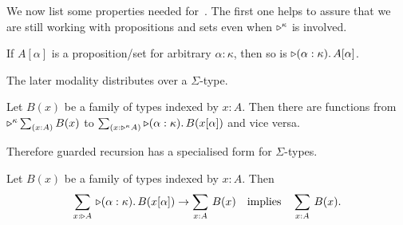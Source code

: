 \documentclass[draft,a4paper,UKenglish,numberwithinsect,cleveref,thm-restate]{lipics-v2021}
\numberwithin{equation}{section}
\theoremstyle{definition}
\theoremstyle{plain}
\begin{document}
We now list some properties needed for~.
The first one helps to assure that we are still working with propositions and sets even when $\mathord{\triangleright}^\kappa$ is involved.%
\begin{lemma}
  If $A[\alpha]$ is a proposition/set for arbitrary $\alpha : \kappa$, then so is $\mathord{\triangleright}(\alpha: \kappa).\, A [\alpha]$.
\end{lemma}
The later modality distributes over a $\Sigma$-type.
\begin{lemma}\label{lem:later-sum}
  Let $B(x)$ be a family of types indexed by $x : A$.
  Then there are functions from $\laterp^\kappa \sm{x : A} B(x)$ to $\sm{x : \laterp^\kappa A} \laterp (\alpha : \kappa).\, B(x [\alpha])$ and vice versa.
\end{lemma}
Therefore guarded recursion has a specialised form for $\Sigma$-types.
\begin{corollary} \label{coro:lob-induction-sum}
  Let $B(x)$ be a family of types indexed by $x : A$.
  Then
  \[
    \sm{x : \laterp A} \laterp (\alpha : \kappa).\,B(x[\alpha]) \to \sm{x : A} B(x) \quad\text{implies}\quad \sm{x : A} B(x).
  \]
\end{corollary}
\end{document}
